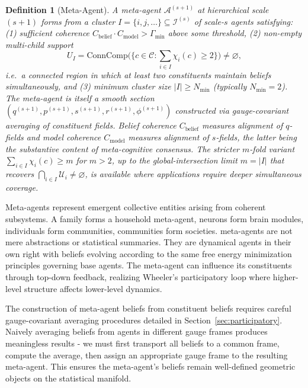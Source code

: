 \documentclass[11pt]{article}
\newtheorem{definition}{Definition}
\begin{document}
\begin{definition}[Meta-Agent]
A meta-agent $\mathcal{A}^{(s+1)}$ at hierarchical scale $(s+1)$ forms from a cluster $I = \{i, j, \ldots\} \subseteq \mathcal{I}^{(s)}$ of scale-$s$ agents satisfying: (1) sufficient coherence $C_{\text{belief}} \cdot C_{\text{model}} > \Gamma_{\min}$ above some threshold, (2) non-empty multi-child support
\begin{equation}
U_I = \mathrm{ConnComp}\Big(\big\{c \in \mathcal{C}: \textstyle\sum_{i \in I} \chi_i(c) \ge 2\big\}\Big) \neq \varnothing,
\label{eq:meta_agent_support}
\end{equation}
i.e.\ a connected region in which at least two constituents maintain beliefs simultaneously, and (3) minimum cluster size $|I| \geq N_{\min}$ (typically $N_{\min} = 2$). The meta-agent is itself a smooth section $(q^{(s+1)}, p^{(s+1)}, s^{(s+1)}, r^{(s+1)}, \phi^{(s+1)})$ constructed via gauge-covariant averaging of constituent fields. Belief coherence $C_{\text{belief}}$ measures alignment of $q$-fields and model coherence $C_{\text{model}}$ measures alignment of $s$-fields, the latter being the substantive content of meta-cognitive consensus. The stricter $m$-fold variant $\sum_{i \in I}\chi_i(c) \ge m$ for $m > 2$, up to the global-intersection limit $m = |I|$ that recovers $\bigcap_{i \in I}\mathcal{U}_i \neq \varnothing$, is available where applications require deeper simultaneous coverage.
\end{definition}

Meta-agents represent emergent collective entities arising from coherent subsystems. A family forms a household meta-agent, neurons form brain modules, individuals form communities, communities form societies. meta-agents are not mere abstractions or statistical summaries. They are dynamical agents in their own right with beliefs evolving according to the same free energy minimization principles governing base agents. The meta-agent can influence its constituents through top-down feedback, realizing Wheeler's participatory loop where higher-level structure affects lower-level dynamics.

The construction of meta-agent beliefs from constituent beliefs requires careful gauge-covariant averaging procedures detailed in Section~\ref{sec:participatory}. Naively averaging beliefs from agents in different gauge frames produces meaningless results - we must first transport all beliefs to a common frame, compute the average, then assign an appropriate gauge frame to the resulting meta-agent. This ensures the meta-agent's beliefs remain well-defined geometric objects on the statistical manifold.
\end{document}
